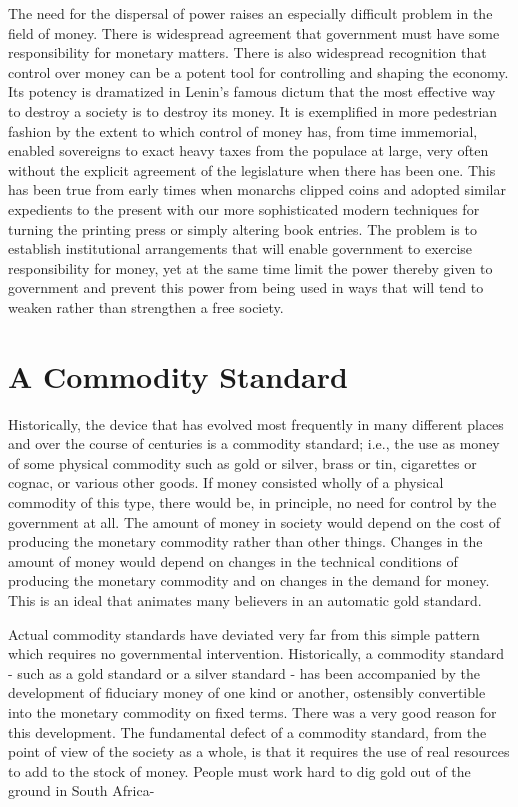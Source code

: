 \documentclass[11pt,openany]{book}
\newcommand{\booksection}[1]{%
  \phantomsection\section*{#1}%
  \addcontentsline{toc}{section}{#1}\markright{#1}}
\begin{document}
The need for the dispersal of power raises an especially difficult problem in the field of money. There is widespread agreement that government must have some responsibility for monetary matters. There is also widespread recognition that control over money can be a potent tool for controlling and shaping the economy. Its potency is dramatized in Lenin's famous dictum that the most effective way to destroy a society is to destroy its money. It is exemplified in more pedestrian fashion by the extent to which control of money has, from time immemorial, enabled sovereigns to exact heavy taxes from the populace at large, very often without the explicit agreement of the legislature when there has been one. This has been true from early times when monarchs clipped coins and adopted similar expedients to the present with our more sophisticated modern techniques for turning the printing press or simply altering book entries. The problem is to establish institutional arrangements that will enable government to exercise responsibility for money, yet at the same time limit the power thereby given to government and prevent this power from being used in ways that will tend to weaken rather than strengthen a free society.

\booksection{A Commodity Standard}

Historically, the device that has evolved most frequently in many different places and over the course of centuries is a commodity standard; i.e., the use as money of some physical commodity such as gold or silver, brass or tin, cigarettes or cognac, or various other goods. If money consisted wholly of a physical commodity of this type, there would be, in principle, no need for control by the government at all. The amount of money in society would depend on the cost of producing the monetary commodity rather than other things. Changes in the amount of money would depend on changes in the technical conditions of producing the monetary commodity and on changes in the demand for money. This is an ideal that animates many believers in an automatic gold standard.

Actual commodity standards have deviated very far from this simple pattern which requires no governmental intervention. Historically, a commodity standard - such as a gold standard or a silver standard - has been accompanied by the development of fiduciary money of one kind or another, ostensibly convertible into the monetary commodity on fixed terms. There was a very good reason for this development. The fundamental defect of a commodity standard, from the point of view of the society as a whole, is that it requires the use of real resources to add to the stock of money. People must work hard to dig gold out of the ground in South Africa-
\end{document}
